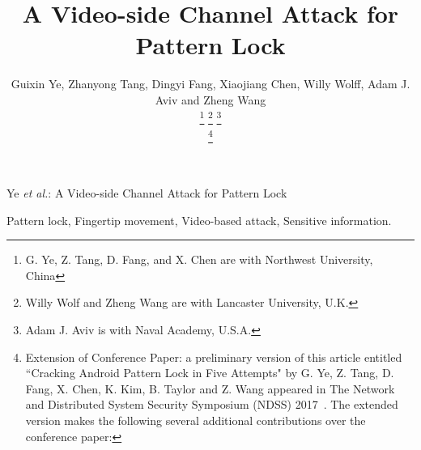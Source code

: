 \documentclass[journal,table]{IEEEtran}
\begin{document}
\title{A Video-side Channel Attack for Pattern Lock}
\author{Guixin Ye, Zhanyong Tang, Dingyi Fang, Xiaojiang Chen,
        Willy Wolff, Adam J. Aviv and Zheng Wang
        
    \thanks{G. Ye, Z. Tang, D. Fang, and X. Chen are with Northwest University, China}%
    \thanks{Willy Wolf and Zheng Wang are with Lancaster University, U.K.}
    \thanks{Adam J. Aviv is with Naval Academy, U.S.A.}
    
    \thanks{
            Extension of Conference Paper: a preliminary version of this article entitled ``Cracking Android Pattern Lock
            in Five Attempts" by G. Ye, Z. Tang, D. Fang, X. Chen, K. Kim, B. Taylor and Z. Wang appeared in
            The Network and Distributed System Security Symposium (NDSS) 2017~\cite{ye2017cracking}.
            The extended version makes the following several additional contributions over the conference
            paper: 
    }
}


%
{Ye \MakeLowercase{\textit{et al.}}: A Video-side Channel Attack for Pattern Lock}

\maketitle



\begin{IEEEkeywords}
    Pattern lock, Fingertip movement, Video-based attack, Sensitive information.
\end{IEEEkeywords}












\IEEEpeerreviewmaketitle


\ifCLASSOPTIONcaptionsoff
  \newpage
\fi


\balance

\end{document}
